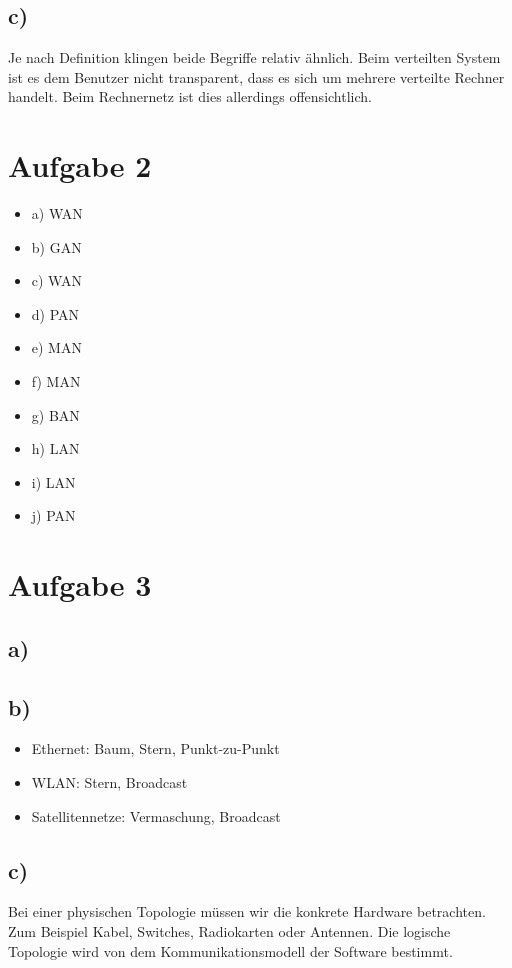 \documentclass[a4paper,12pt]{scrartcl}
\begin{document}
\subsection{c)}
Je nach Definition klingen beide Begriffe relativ ähnlich. Beim verteilten
System ist es dem Benutzer nicht transparent, dass es sich um mehrere verteilte
Rechner handelt. Beim Rechnernetz ist dies allerdings offensichtlich.

\section{Aufgabe 2}
\begin{itemize}
	\item a) WAN
	\item b) GAN
	\item c) WAN
	\item d) PAN
	\item e) MAN
	\item f) MAN
	\item g) BAN
	\item h) LAN
	\item i) LAN
	\item j) PAN
\end{itemize}

\section{Aufgabe 3}
\subsection{a)}

\subsection{b)}
\begin{itemize}
	\item Ethernet: Baum, Stern, Punkt-zu-Punkt
	\item WLAN: Stern, Broadcast
	\item Satellitennetze: Vermaschung, Broadcast
\end{itemize}

\subsection{c)}
Bei einer physischen Topologie müssen wir die konkrete Hardware betrachten.
Zum Beispiel Kabel, Switches, Radiokarten oder Antennen. Die logische
Topologie wird von dem Kommunikationsmodell der Software bestimmt.
\end{document}
